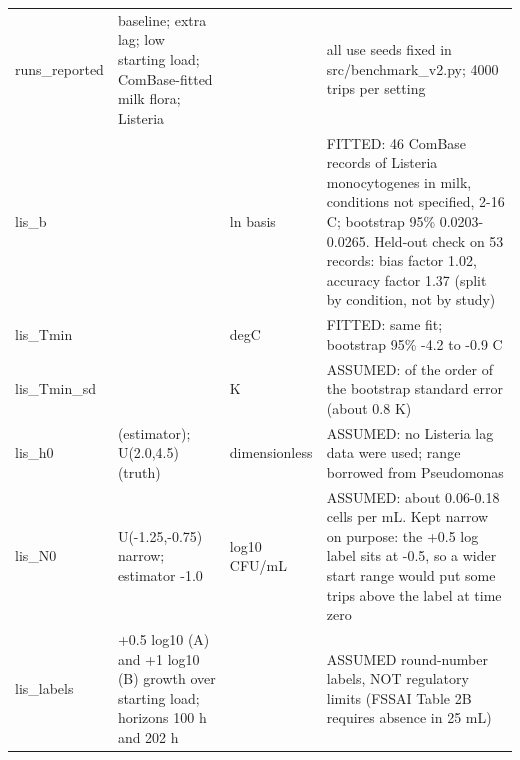 {{\begin{longtable}{@{}>{\raggedright\arraybackslash}p{2.7cm}>{\raggedright\arraybackslash}p{2.9cm}>{\raggedright\arraybackslash}p{1.6cm}>{\raggedright\arraybackslash}p{6.6cm}@{}}
runs\_\allowbreak{}reported & baseline; extra lag; low starting load; ComBase-fitted milk flora; Listeria &  & all use seeds fixed in src/benchmark\_\allowbreak{}v2.py; 4000 trips per setting\\
lis\_\allowbreak{}b & 0.0235 & ln basis & FITTED: 46 ComBase records of Listeria monocytogenes in milk, conditions not specified, 2-16 C; bootstrap 95\% 0.0203-0.0265. Held-out check on 53 records: bias factor 1.02, accuracy factor 1.37 (split by condition, not by study)\\
lis\_\allowbreak{}Tmin & -2.3 & degC & FITTED: same fit; bootstrap 95\% -4.2 to -0.9 C\\
lis\_\allowbreak{}Tmin\_\allowbreak{}sd & 1.0 & K & ASSUMED: of the order of the bootstrap standard error (about 0.8 K)\\
lis\_\allowbreak{}h0 & 3.0 (estimator); U(2.0,4.5) (truth) & dimensionless & ASSUMED: no Listeria lag data were used; range borrowed from Pseudomonas\\
lis\_\allowbreak{}N0 & U(-1.25,-0.75) narrow; estimator -1.0 & log10 CFU/mL & ASSUMED: about 0.06-0.18 cells per mL. Kept narrow on purpose: the +0.5 log label sits at -0.5, so a wider start range would put some trips above the label at time zero\\
lis\_\allowbreak{}labels & +0.5 log10 (A) and +1 log10 (B) growth over starting load; horizons 100 h and 202 h &  & ASSUMED round-number labels, NOT regulatory limits (FSSAI Table 2B requires absence in 25 mL)\\
\end{longtable}}}

